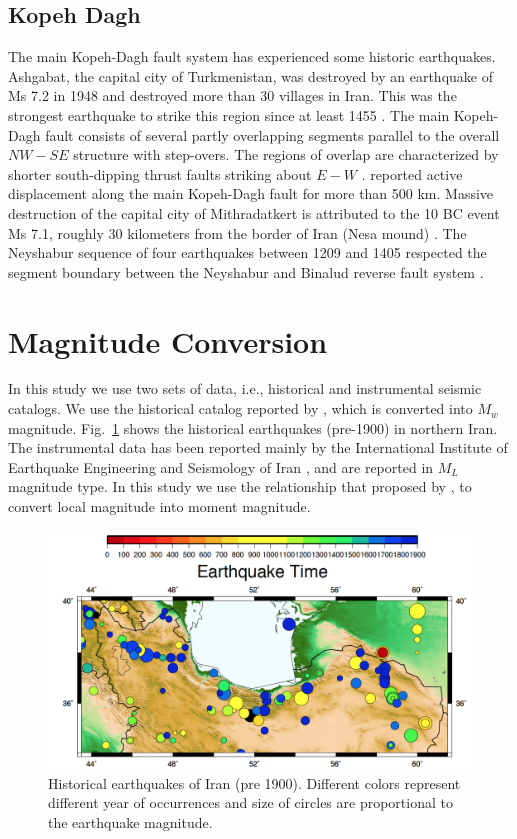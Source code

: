 \documentclass{article}
\begin{document}
\subsection{Kopeh Dagh}
The main Kopeh-Dagh fault system has experienced some historic earthquakes. Ashgabat, the capital city of Turkmenistan, was destroyed by an earthquake of Ms 7.2 in 1948 and destroyed more than 30 villages in Iran. This was the strongest earthquake to strike this region since at least 1455 \citep{Berberian2001}.
The main Kopeh-Dagh fault consists of several partly overlapping segments parallel to the overall $NW - SE$ structure with step-overs. The regions of overlap are characterized by shorter south-dipping thrust faults striking about $E - W$ \citep{Berberian2001}. \citet{Trifonov1978} reported active displacement along the main Kopeh-Dagh fault for more than 500 km. 
Massive destruction of the capital city of Mithradatkert is attributed to the 10 BC event Ms 7.1, roughly 30 kilometers from the border of Iran (Nesa mound) \citep{Berberian2001}.
The Neyshabur sequence of four earthquakes between 1209 and 1405 respected the segment boundary between the Neyshabur and Binalud reverse fault system \citep{Berberian1999}.



\section{Magnitude Conversion}

In this study we use two sets of data, i.e., historical and instrumental seismic catalogs. We use the historical catalog reported by \citep{Karimiparidari2013}, which is converted into $M_w$ magnitude. Fig.~\ref{fig:historical} shows the historical earthquakes (pre-1900) in northern Iran. The instrumental data has been reported mainly by the International Institute of Earthquake Engineering and Seismology of Iran \citep{IIEES}, and are reported in $M_L$ magnitude type. In this study we use the relationship that proposed by \citet{Karimiparidari2013}, to convert local magnitude into moment magnitude. 

\begin{figure} [H]
\centering
\includegraphics[scale=0.8]{figures/pdf/Figure2.pdf} 
\caption{Historical earthquakes of Iran (pre 1900). Different colors represent different year of occurrences and size of circles are proportional to the earthquake magnitude. }
\label{fig:historical}
\end{figure}
\end{document}
